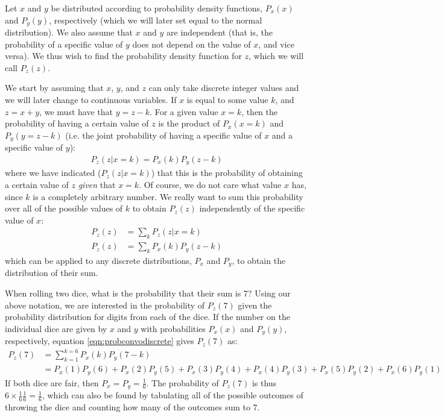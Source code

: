 Let $x$ and $y$ be distributed according to probability density functions, $P_x(x)$ and $P_y(y)$, respectively (which we will later set equal to the normal distribution). We also assume that $x$ and $y$ are independent (that is, the probability of a specific value of $y$ does not depend on the value of $x$, and vice versa). We thus wish to find the probability density function for $z$, which we will call $P_z(z)$.

We start by assuming that $x$, $y$, and $z$ can only take discrete integer values and we will later change to continuous variables. If $x$ is equal to some value $k$, and $z=x+y$, we must have that $y=z-k$. For a given value $x=k$, then the probability of having a certain value of $z$ is the product of $P_x(x=k)$ and $P_y(y=z-k)$ (i.e. the joint probability of having a specific value of $x$ and a specific value of $y$):
\begin{align*}
P_z(z|x=k)=P_x(k)P_y(z-k)
\end{align*} 
where we have indicated ($P_z(z|x=k)$) that this is the probability of obtaining a certain value of $z$ \textit{given} that $x=k$. Of course, we do not care what value $x$ has, since $k$ is a completely arbitrary number. We really want to sum this probability over all of the possible values of $k$ to obtain $P_z(z)$ independently of the specific value of $x$:
\begin{align}
\label{eqn:probconvodiscrete}
P_z(z)&=\sum_kP_z(z|x=k)\nonumber\\
P_z(z)&=\sum_kP_x(k)P_y(z-k)
\end{align}
which can be applied to any discrete distributions, $P_x$ and $P_y$, to obtain the distribution of their sum. 
\begin{example}{}{When rolling two dice, what is the probability that their sum is 7?}{}
Using our above notation, we are interested in the probability of $P_z(7)$ given the probability distribution for digits from each of the dice. If the number on the individual dice are given by $x$ and $y$ with probabilities $P_x(x)$ and $P_y(y)$, respectively, equation \ref{eqn:probconvodiscrete} gives $P_z(7)$ as:
\begin{align*}
P_z(7)&=\sum_{k=1}^{k=6} P_x(k)P_y(7-k)\\
 &=P_x(1)P_y(6)+P_x(2)P_y(5)+P_x(3)P_y(4)+P_x(4)P_y(3)+P_x(5)P_y(2)+P_x(6)P_y(1)
\end{align*} 
If both dice are fair, then $P_x=P_y=\frac{1}{6}$. The probability of $P_z(7)$ is thus $6\times\frac{1}{6}\frac{1}{6}=\frac{1}{6}$, which can also be found by tabulating all of the possible outcomes of throwing the dice and counting how many of the outcomes sum to 7. 
\end{example}

